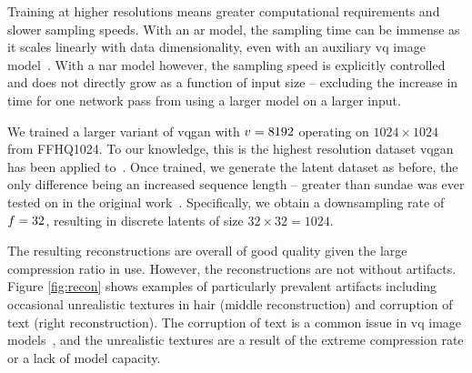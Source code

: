 Training at higher resolutions means greater computational requirements and
slower sampling speeds. With an \gls{ar} model, the sampling time can be
immense as it scales linearly with data dimensionality, even with an auxiliary
\gls{vq} image model~\cite{esser2021taming}. With a \gls{nar} model however, the
sampling speed is explicitly controlled and does not directly grow as a function
of input size -- excluding the increase in time for one network pass from using
a larger model on a larger input.

We trained a larger variant of \gls{vqgan} with $v = 8192$ operating on
$1024 \times 1024$ from FFHQ1024. To our knowledge, this is the highest resolution
dataset \gls{vqgan} has been applied to~\cite{esser2021taming}. Once trained,
we generate the latent dataset as before, the only difference being an increased
sequence length -- greater than \gls{sundae} was ever tested on in the original
work~\cite{savinov2022stepunrolled}. Specifically, we obtain a downsampling rate
of $f=32$, resulting in discrete latents of size $32 \times 32 =
1024$.

The resulting reconstructions are overall of good quality given the large
compression ratio in use. However, the reconstructions are not without
artifacts. Figure \ref{fig:recon} shows examples of particularly prevalent
artifacts including occasional unrealistic textures in hair (middle
reconstruction) and corruption of text (right reconstruction). The corruption of
text is a common issue in \gls{vq} image models~\cite{ramesh2021dalle}, and the
unrealistic textures are a result of the extreme compression rate or a lack of
model capacity.

